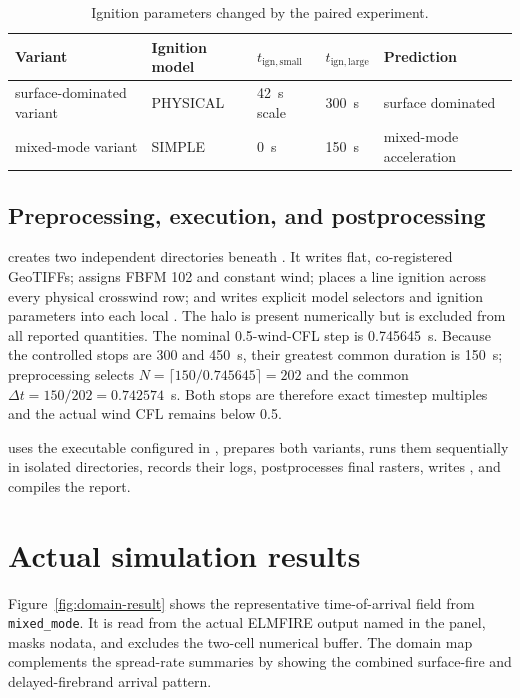 \begin{table}[htbp]
\centering
\caption{Ignition parameters changed by the paired experiment.}
\label{tab:variant-config}
\begin{tabular}{lllll}
\toprule
Variant & Ignition model & $t_{\mathrm{ign,small}}$ & $t_{\mathrm{ign,large}}$ & Prediction \\
\midrule
surface-dominated variant & PHYSICAL & \SI{42}{\second} scale & \SI{300}{\second} & surface dominated \\
mixed-mode variant & SIMPLE & \SI{0}{\second} & \SI{150}{\second} & mixed-mode acceleration \\
\bottomrule
\end{tabular}
\end{table}

\subsection{Preprocessing, execution, and postprocessing}

 creates two independent directories beneath
. It writes flat, co-registered GeoTIFFs; assigns FBFM 102 and
constant wind; places a line ignition across every physical crosswind row; and
writes explicit model selectors and ignition parameters into each local
. The halo is present numerically but is excluded from
all reported quantities. The nominal 0.5-wind-CFL step is 0.745645~s. Because the controlled stops are 300 and 450~s, their greatest common duration is 150~s; preprocessing selects \(N=\lceil150/0.745645\rceil=202\) and the common \(\Delta t=150/202=0.742574\)~s. Both stops are therefore exact timestep multiples and the actual wind CFL remains below 0.5.

 uses the executable configured in , prepares both variants, runs them sequentially in isolated directories, records their logs, postprocesses final rasters, writes , and compiles the report.

\clearpage
\section{Actual simulation results}

Figure~\ref{fig:domain-result} shows the representative time-of-arrival field from \texttt{mixed\_mode}.
It is read from the actual ELMFIRE output named in the panel, masks nodata, and excludes
the two-cell numerical buffer.  The domain map complements the spread-rate summaries by showing the combined surface-fire and delayed-firebrand arrival pattern.

